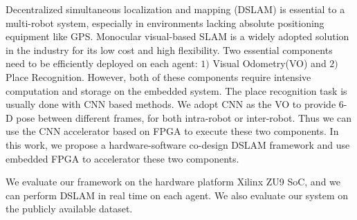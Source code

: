Decentralized simultaneous localization and mapping (DSLAM) is essential to a multi-robot system, especially in environments lacking absolute positioning equipment like GPS.
Monocular visual-based SLAM is a widely adopted solution in the industry for its low cost and high flexibility.
Two essential components need to be efficiently deployed on each agent: $1)$ Visual Odometry(VO) and $2)$ Place Recognition. However, both of these components require intensive computation and storage on the embedded system.
The place recognition task is usually done with CNN based methods. We adopt CNN as the VO to provide 6-D pose between different frames, for both intra-robot or inter-robot. Thus we can use the CNN accelerator based on FPGA to execute these two components.
In this work, we propose a hardware-software co-design DSLAM framework and use embedded FPGA to accelerator these two components.

We evaluate our framework on the hardware platform Xilinx ZU9 SoC, and we can perform DSLAM in real time on each agent. We also evaluate our system on the publicly available dataset.